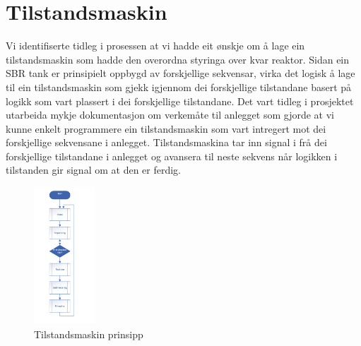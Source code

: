 \section{Tilstandsmaskin}
\thispagestyle{fancy}


Vi identifiserte tidleg i prosessen at vi hadde eit ønskje om å lage ein tilstandsmaskin som hadde den overordna styringa over kvar reaktor. 
Sidan ein SBR tank er prinsipielt oppbygd av forskjellige sekvensar, virka det logisk å lage til ein tilstandsmaskin som gjekk igjennom dei forskjellige tilstandane basert på logikk som vart plassert i dei forskjellige tilstandane. 
Det vart tidleg i prosjektet utarbeida mykje dokumentasjon om verkemåte til anlegget som gjorde at vi kunne enkelt programmere ein tilstandsmaskin som vart intregert mot dei forskjellige sekvensane i anlegget. 
Tilstandsmaskina tar inn signal i frå dei forskjellige tilstandane i anlegget og avansera til neste sekvens når logikken i tilstanden gir signal om at den er ferdig. 

\begin{figure}[htbp]
    \centering
    \includegraphics[width=0.2\textwidth]{Bilder/Tilstandsmaskin_prinsipp.png}
    \caption{Tilstandsmaskin prinsipp}\label{fig:Tilstandsmaskin prinsipp}    
\end{figure}

\newpage

